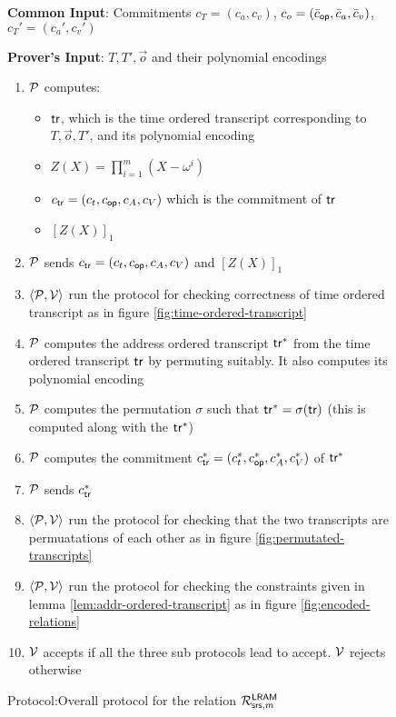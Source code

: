 \begin{figure}[htbp]

    \begin{mdframed}
    {
            {\bf Common Input}: Commitments $c_T=(c_a,c_v)$, $c_o=(\bar{c}_{\mathsf{op}}, \bar{c}_a, \bar{c}_v)$, $c_T'=(c_a', c_v')$

            {\bf Prover's Input}: $ T, T', \vec{o}$ and their polynomial encodings
        \begin{enumerate}[leftmargin=1em, label=\arabic*.]
            \item $\mathcal{P}$ computes:
            \begin{itemize}
                \item $\mathsf{tr}$, which is the time ordered transcript corresponding to $T, \vec{o}, T'$, and its polynomial encoding
                \item $Z(X)=\prod_{i=1}^m (X-\omega^i)$
                \item $c_{\mathsf{tr}}=(c_t, c_{\mathsf{op}}, c_A, c_V)$ which is the commitment of $\mathsf{tr}$
                \item $[Z(X)]_1$
            \end{itemize}

            \item $\mathcal{P}$ sends  $c_{\mathsf{tr}}=(c_t, c_{\mathsf{op}}, c_A, c_V)$ and $[Z(X)]_1$
            \item $\left<\mathcal{P}, \mathcal{V} \right>$ run the protocol for checking correctness of time ordered transcript as in figure \ref{fig:time-ordered-transcript}
            \item $\mathcal{P}$ computes the address ordered transcript $\mathsf{tr}^{*}$ from the time ordered transcript $\mathsf{tr}$ by permuting suitably. It also computes its polynomial encoding
            \item $\mathcal{P}$ computes the permutation $\sigma$ such that $\mathsf{tr}^{*}= \sigma(\mathsf{tr})$ (this is computed along with the $\mathsf{tr}^{*}$)
            \item $\mathcal{P}$ computes the commitment $c_{\mathsf{tr}}^\ast=(c_t^\ast,c_{\mathsf{op}}^\ast, c_A^\ast, c_V^\ast)$ of $\mathsf{tr}^{*}$
            \item $\mathcal{P}$ sends  $c_{\mathsf{tr}}^\ast$
            \item $\left<\mathcal{P}, \mathcal{V} \right>$ run the protocol for checking that the two transcripts are permuatations of each other as in figure \ref{fig:permutated-transcripts}
            \item $\left<\mathcal{P}, \mathcal{V} \right>$ run the protocol for checking the constraints given in lemma \ref{lem:addr-ordered-transcript} as in figure \ref{fig:encoded-relations}
            \item $\mathcal{V}$ accepts if all the three sub protocols lead to accept. $\mathcal{V}$ rejects otherwise
        \end{enumerate}
    }
    \end{mdframed}
    \vspace*{-5mm}
    \caption{Protocol:Overall protocol for the relation $\mathcal{R}^{\mathsf{LRAM}}_{\mathsf{srs},m}$}
    \label{fig:covering-protocol}
\end{figure}

